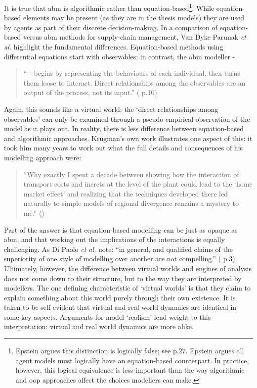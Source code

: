 It is true that \gls{abm} is algorithmic rather than equation-based\footnote{Epstein argues this distinction is logically false; see \citealt{epstein_generative_2006} p.27. Epstein argues all agent models must logically have an equation-based counterpart. In practice, however, this logical equivalence is less important than the way algorithmic and \gls{oop} approaches affect the choices modellers can make.}. While equation-based elements may be present (as they are in the thesis models) they are used by agents as part of their discrete decision-making. In a comparison of equation-based versus \gls{abm} methods for supply-chain management, Van Dyke Parunak \emph{et al.} highlight the fundamental differences. Equation-based methods using differential equations start with observables; in contrast, the \gls{abm} modeller -

\begin{quote}
`` - begins by representing the behaviours of each individual, then turns them loose to interact. Direct relationships among the observables are an output of the process, not its input.'' (\citealt{van_dyke_parunak_agent-based_1998} p.10)
\end{quote}

Again, this sounds like a virtual world: the `direct relationships among observables' can only be examined through a pseudo-empirical observation of the model as it plays out. In reality, there is less difference between equation-based and algorithmic approaches. Krugman's own work illustrates one aspect of this: it took him many years to work out what the full details and consequences of his modelling approach were:

\begin{quote}
``Why exactly I spent a decade between showing how the interaction of transport costs and \gls{increts} at the level of the plant could lead to the `home market effect' and realizing that the techniques developed there led naturally to simple models of regional divergence remains a mystery to me.'' (\citealt{krugman_was_1999})
\end{quote}

Part of the answer is that equation-based modelling can be just as opaque as \gls{abm}, and that working out the implications of the interactions is equally challenging. As Di Paolo \emph{et al.} note: ``in general, and qualified claims of the superiority of one style of modelling over another are not compelling.'' (\citealt{di_paolo_simulation_2000} p.3) Ultimately, however, the difference between virtual worlds and engines of analysis does not come down to their structure, but to the way they are interpreted by modellers. The one defining characteristic of `virtual worlds' is that they claim to explain something about this world purely through their own existence. It is taken to be self-evident that virtual and real world dynamics are identical in some key aspects. Arguments for model `realism' lend weight to this interpretation: virtual and real world dynamics are more alike.

